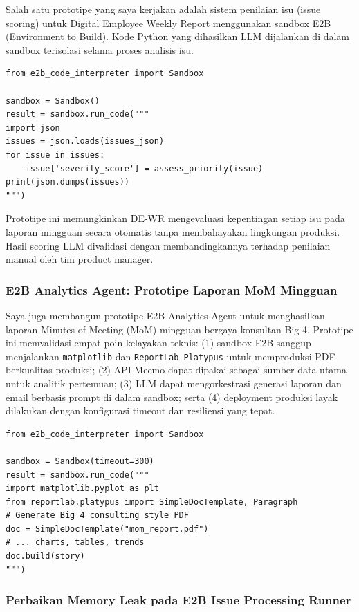 Salah satu prototipe yang saya kerjakan adalah sistem penilaian isu (issue scoring) untuk Digital Employee Weekly Report menggunakan sandbox E2B (Environment to Build). Kode Python yang dihasilkan LLM dijalankan di dalam sandbox terisolasi selama proses analisis isu.

\begin{lstlisting}[caption={Konfigurasi dan eksekusi di E2B sandbox}]
from e2b_code_interpreter import Sandbox

sandbox = Sandbox()
result = sandbox.run_code("""
import json
issues = json.loads(issues_json)
for issue in issues:
    issue['severity_score'] = assess_priority(issue)
print(json.dumps(issues))
""")
\end{lstlisting}

Prototipe ini memungkinkan DE-WR mengevaluasi kepentingan setiap isu pada laporan mingguan secara otomatis tanpa membahayakan lingkungan produksi. Hasil scoring LLM divalidasi dengan membandingkannya terhadap penilaian manual oleh tim product manager.

\subsubsection{E2B Analytics Agent: Prototipe Laporan MoM Mingguan}

Saya juga membangun prototipe E2B Analytics Agent untuk menghasilkan laporan Minutes of Meeting (MoM) mingguan bergaya konsultan Big 4. Prototipe ini memvalidasi empat poin kelayakan teknis: (1) sandbox E2B sanggup menjalankan \texttt{matplotlib} dan \texttt{ReportLab Platypus} untuk memproduksi PDF berkualitas produksi; (2) API Meemo dapat dipakai sebagai sumber data utama untuk analitik pertemuan; (3) LLM dapat mengorkestrasi generasi laporan dan email berbasis prompt di dalam sandbox; serta (4) deployment produksi layak dilakukan dengan konfigurasi timeout dan resiliensi yang tepat.

\begin{lstlisting}[caption={Pola inti prototipe E2B Analytics Agent}]
from e2b_code_interpreter import Sandbox

sandbox = Sandbox(timeout=300)
result = sandbox.run_code("""
import matplotlib.pyplot as plt
from reportlab.platypus import SimpleDocTemplate, Paragraph
# Generate Big 4 consulting style PDF
doc = SimpleDocTemplate("mom_report.pdf")
# ... charts, tables, trends
doc.build(story)
""")
\end{lstlisting}

\subsubsection{Perbaikan Memory Leak pada E2B Issue Processing Runner}


